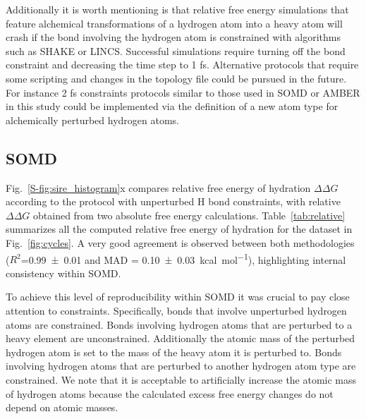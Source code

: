\documentclass[journal=jctcce,manuscript=article]{achemso}
\newcommand{\inpopt}[1]{\texttt{#1}}
\begin{document}
Additionally it is worth mentioning is that relative free energy
simulations that feature alchemical transformations of a hydrogen atom into a heavy atom will crash if the bond involving the hydrogen atom is constrained with algorithms such as SHAKE or LINCS.
Successful simulations require turning off the bond constraint and decreasing the time step to 1 fs. Alternative protocols that require some scripting and changes in the topology file could be pursued in the future. For instance 2 fs constraints protocols similar to those used in SOMD or AMBER in this study could be implemented via the definition of a new atom type for alchemically perturbed hydrogen atoms.

\subsection{SOMD}
\label{sec:somd-results}

Fig.~\ref{S-fig:sire_histogram}x compares relative free energy of hydration
$\Delta\Delta G$ according to the protocol with unperturbed H bond constraints, with relative
$\Delta \Delta G$ obtained from two absolute free energy calculations.
Table~\ref{tab:relative} summarizes all the computed relative free energy of
hydration for the dataset in Fig.~\ref{fig:cycles}.
A very good agreement is observed between both methodologies
($R^2$=\SI{0.99+-0.01}{} and MAD = \SI{0.10+-0.03}{kcal.mol^{-1}}),
highlighting internal consistency within SOMD.

To achieve this level of reproducibility within SOMD it was crucial to pay close attention to constraints. Specifically, bonds that involve unperturbed hydrogen atoms are constrained. Bonds involving hydrogen atoms that are perturbed to a heavy element are unconstrained.  Additionally the atomic mass of the perturbed hydrogen atom is set to the mass of the heavy atom it is
perturbed to.  Bonds involving hydrogen atoms that are perturbed to another hydrogen atom type are constrained. We note that it is acceptable to artificially increase the atomic mass of hydrogen atoms because the calculated excess free energy changes do not depend on atomic masses.
\end{document}
